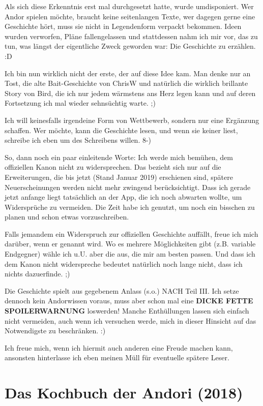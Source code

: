 {Als sich diese Erkenntnis erst mal durchgesetzt hatte, wurde umdisponiert. Wer Andor spielen möchte, braucht keine seitenlangen Texte, wer dagegen gerne eine Geschichte hört, muss sie nicht in Legendenform verpackt bekommen. Ideen wurden verworfen, Pläne fallengelassen und stattdessen nahm ich mir vor, das zu tun, was längst der eigentliche Zweck geworden war: Die Geschichte zu erzählen. :D\bigskip

Ich bin nun wirklich nicht der erste, der auf diese Idee kam. Man denke nur an Tost, die alte Bait-Geschichte von ChrisW und natürlich die wirklich brillante Story von Bird, die ich nur jedem wärmstens ans Herz legen kann und auf deren Fortsetzung ich mal wieder sehnsüchtig warte. ;)

Ich will keinesfalls irgendeine Form von Wettbewerb, sondern nur eine Ergänzung schaffen. Wer möchte, kann die Geschichte lesen, und wenn sie keiner liest, schreibe ich eben um des Schreibens willen. 8-)\bigskip

So, dann noch ein paar einleitende Worte: Ich werde mich bemühen, dem offiziellen Kanon nicht zu widersprechen. Das bezieht sich nur auf die Erweiterungen, die bis jetzt (Stand Januar 2019) erschienen sind, spätere Neuerscheinungen werden nicht mehr zwingend berücksichtigt. Dass ich gerade jetzt anfange liegt tatsächlich an der App, die ich noch abwarten wollte, um Widersprüche zu vermeiden. Die Zeit habe ich genutzt, um noch ein bisschen zu planen und schon etwas vorzuschreiben.

Falls jemandem ein Widerspruch zur offiziellen Geschichte auffällt, freue ich mich darüber, wenn er genannt wird. Wo es mehrere Möglichkeiten gibt (z.B. variable Endgegner) wähle ich u.U. aber die aus, die mir am besten passen. Und dass ich dem Kanon nicht widerspreche bedeutet natürlich noch lange nicht, dass ich nichts dazuerfinde. ;)

Die Geschichte spielt aus gegebenem Anlass (s.o.) NACH Teil III. Ich setze dennoch kein Andorwissen voraus, muss aber schon mal eine \textbf{DICKE FETTE SPOILERWARNUNG} loswerden! Manche Enthüllungen lassen sich einfach nicht vermeiden, auch wenn ich versuchen werde, mich in dieser Hinsicht auf das Notwendigste zu beschränken. :)\bigskip

Ich freue mich, wenn ich hiermit auch anderen eine Freude machen kann, ansonsten hinterlasse ich eben meinen Müll für eventuelle spätere Leser.





\newpage
\section{Das Kochbuch der Andori (2018)}

}
